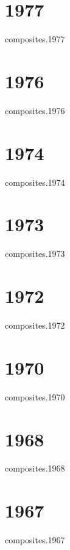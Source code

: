 \documentclass[12pt]{article}
\begin{document}
%
\section*{1977}
\begin{btSect}{composites.1977}
\btPrintAll
\end{btSect}

\section*{1976}
\begin{btSect}{composites.1976}
\btPrintAll
\end{btSect}
%
\section*{1974}
\begin{btSect}{composites.1974}
\btPrintAll
\end{btSect}
%
\section*{1973}
\begin{btSect}{composites.1973}
\btPrintAll
\end{btSect}

\section*{1972}
\begin{btSect}{composites.1972}
\btPrintAll
\end{btSect}

%
\section*{1970}
\begin{btSect}{composites.1970}
\btPrintAll
\end{btSect}
%
\section*{1968}
\begin{btSect}{composites.1968}
\btPrintAll
\end{btSect}
%
\section*{1967}
\begin{btSect}{composites.1967}
\btPrintAll
\end{btSect}
\end{document}

